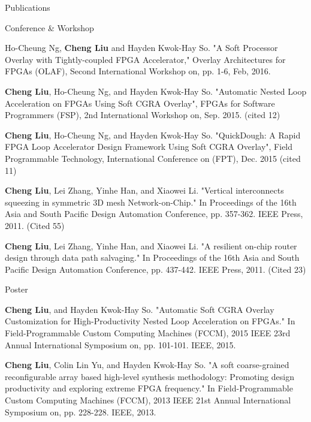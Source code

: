 \documentclass{resume} %
\begin{document}
\begin{rSection}{Publications}
    \begin{rSubsection} {Conference \& Workshop}{}{}{}
    \item Ho-Cheung Ng, \textbf{Cheng Liu} and Hayden Kwok-Hay So. "A Soft Processor Overlay with
        Tightly-coupled FPGA Accelerator," Overlay Architectures for FPGAs (OLAF), Second
        International Workshop on, pp. 1-6, Feb, 2016. 
    \item \textbf{Cheng Liu}, Ho-Cheung Ng, and Hayden Kwok-Hay So. "Automatic Nested Loop Acceleration on
        FPGAs Using Soft CGRA Overlay", FPGAs for Software Programmers (FSP), 2nd International
        Workshop on, Sep. 2015. (cited 12)
    \item \textbf{Cheng Liu}, Ho-Cheung Ng, and Hayden Kwok-Hay So. "QuickDough: A Rapid FPGA Loop
        Accelerator Design Framework Using Soft CGRA Overlay", Field Programmable Technology,
        International Conference on (FPT), Dec. 2015 (cited 11) 
    \item \textbf{Cheng Liu}, Lei Zhang, Yinhe Han, and Xiaowei Li. "Vertical interconnects squeezing in
        symmetric 3D mesh Network-on-Chip." In Proceedings of the 16th Asia and South Pacific Design
        Automation Conference, pp. 357-362. IEEE Press, 2011. (Cited 55)
    \item \textbf{Cheng Liu}, Lei Zhang, Yinhe Han, and Xiaowei Li. "A resilient on-chip router design
        through data path salvaging." In Proceedings of the 16th Asia and South Pacific Design
        Automation Conference, pp. 437-442. IEEE Press, 2011. (Cited 23)
    \end{rSubsection}

    \begin{rSubsection} {Poster}{}{}{}
    \item \textbf{Cheng Liu}, and Hayden Kwok-Hay So. "Automatic Soft CGRA Overlay Customization for
        High-Productivity Nested Loop Acceleration on FPGAs." In Field-Programmable Custom Computing
        Machines (FCCM), 2015 IEEE 23rd Annual International Symposium on, pp. 101-101. IEEE, 2015.
    \item \textbf{Cheng Liu}, Colin Lin Yu, and Hayden Kwok-Hay So. "A soft coarse-grained reconfigurable
        array based high-level synthesis methodology: Promoting design productivity and exploring
        extreme FPGA frequency." In Field-Programmable Custom Computing Machines (FCCM), 2013 IEEE
        21st Annual International Symposium on, pp. 228-228. IEEE, 2013. 
    \end{rSubsection}

\end{rSection}
\end{document}
